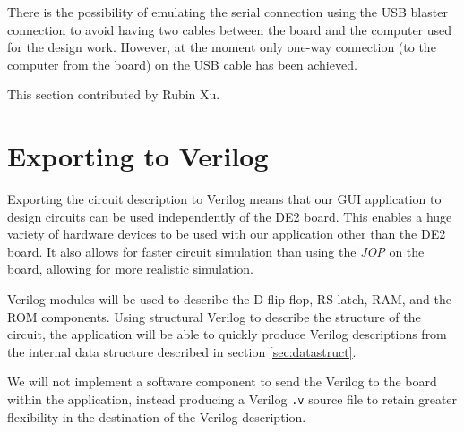 \documentclass[12pt, a4paper, oneside,titlepage]{article}
\begin{document}
There is the possibility of emulating the serial connection using the USB blaster connection to avoid having two cables between the board and the computer used for the design work. However, at the moment only one-way connection (to the computer from the board) on the USB cable has been achieved. 

This section contributed by Rubin Xu.



\section{Exporting to Verilog}
Exporting the circuit description to Verilog means that our GUI application to design circuits can be used independently of the DE2 board. This enables a huge variety of hardware devices to be used with our application other than the DE2 board. It also allows for faster circuit simulation than using the \emph{JOP} on the board, allowing for more realistic simulation. 

Verilog modules will be used to describe the D flip-flop, RS latch, RAM, and the ROM components. Using structural Verilog to describe the structure of the circuit, the application will be able to quickly produce Verilog descriptions from the internal data structure described in section \ref{sec:datastruct}.

We will not implement a software component to send the Verilog to the board within the application, instead producing a Verilog \texttt{.v} source file to retain greater flexibility in the destination of the Verilog description. 
\end{document}
